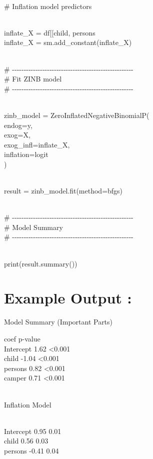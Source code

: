\documentclass[
]{article}
\begin{document}
\strut \\
\# Inflation model predictors\\
\strut \\
inflate\_X = df{[}{[}\textquotesingle child\textquotesingle,
\textquotesingle persons\textquotesingle{]}{]}\\
inflate\_X = sm.add\_constant(inflate\_X)\\
\strut \\
\#
-\/-\/-\/-\/-\/-\/-\/-\/-\/-\/-\/-\/-\/-\/-\/-\/-\/-\/-\/-\/-\/-\/-\/-\/-\/-\/-\/-\/-\/-\/-\/-\/-\/-\/-\/-\/-\/-\/-\/-\/-\/-\/-\/-\/-\/-\/-\/-\/-\/-\/-\/-\\
\# Fit ZINB model\\
\#
-\/-\/-\/-\/-\/-\/-\/-\/-\/-\/-\/-\/-\/-\/-\/-\/-\/-\/-\/-\/-\/-\/-\/-\/-\/-\/-\/-\/-\/-\/-\/-\/-\/-\/-\/-\/-\/-\/-\/-\/-\/-\/-\/-\/-\/-\/-\/-\/-\/-\/-\/-\\
\strut \\
zinb\_model = ZeroInflatedNegativeBinomialP(\\
endog=y,\\
exog=X,\\
exog\_infl=inflate\_X,\\
inflation=\textquotesingle logit\textquotesingle{}\\
)\\
\strut \\
result = zinb\_model.fit(method=\textquotesingle bfgs\textquotesingle)\\
\strut \\
\#
-\/-\/-\/-\/-\/-\/-\/-\/-\/-\/-\/-\/-\/-\/-\/-\/-\/-\/-\/-\/-\/-\/-\/-\/-\/-\/-\/-\/-\/-\/-\/-\/-\/-\/-\/-\/-\/-\/-\/-\/-\/-\/-\/-\/-\/-\/-\/-\/-\/-\/-\/-\\
\# Model Summary\\
\#
-\/-\/-\/-\/-\/-\/-\/-\/-\/-\/-\/-\/-\/-\/-\/-\/-\/-\/-\/-\/-\/-\/-\/-\/-\/-\/-\/-\/-\/-\/-\/-\/-\/-\/-\/-\/-\/-\/-\/-\/-\/-\/-\/-\/-\/-\/-\/-\/-\/-\/-\/-\\
\strut \\
print(result.summary())

\section{\texorpdfstring{\textbf{Example Output
:}}{Example Output :}}\label{example-output-1}

Model Summary (Important Parts)

coef p-value\\
Intercept 1.62 \textless0.001\\
child -1.04 \textless0.001\\
persons 0.82 \textless0.001\\
camper 0.71 \textless0.001\\
\strut \\
Inflation Model\\
\strut \\
Intercept 0.95 0.01\\
child 0.56 0.03\\
persons -0.41 0.04
\end{document}
